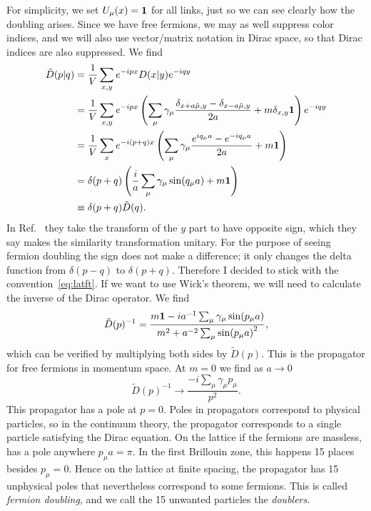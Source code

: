 For simplicity, we set $U_\mu(x)={\mathbf 1}$
for all links, just so we can see clearly how the doubling arises.
Since we have free fermions, we may as well suppress color indices,
and we will also use vector/matrix notation in Dirac space, so that
Dirac indices are also suppressed. We find
\begin{equation}\begin{aligned}
  \tilde{D}(p|q)&=\frac{1}{V}\sum_{x,y}e^{-ipx}D(x|y)e^{-iqy}\\
     &=\frac{1}{V}\sum_{x,y}e^{-ipx}\left(
      \sum_\mu\gamma_\mu\frac{\delta_{x+a\hat{\mu},y}
                             -\delta_{x-a\hat{\mu},y}}{2a}+m\delta_{x,y}{\mathbf 1}
      \right)e^{-iqy}\\
     &=\frac{1}{V}\sum_xe^{-i(p+q)x}\left(
      \sum_\mu\gamma_\mu\frac{e^{iq_\mu a}-e^{-iq_\mu a}}{2a}+m{\mathbf 1}\right)\\
     &=\delta(p+q)\left(\frac{i}{a}\sum_\mu
                    \gamma_\mu\sin(q_\mu a)+m{\mathbf 1}\right)\\
     &\equiv\delta(p+q)\tilde{D}(q).
\end{aligned}\end{equation}
In Ref.~\cite{gattringer_quantum_2010} they take the transform
of the $y$ part to have opposite sign, which they say makes the similarity
transformation unitary. For the purpose of seeing fermion doubling
the sign does not make a difference; it only changes the delta
function from $\delta(p-q)$ to $\delta(p+q)$. Therefore I decided to stick
with the convention~\eqref{eq:latft}. If we want to use Wick's theorem,
we will need to calculate the inverse of the Dirac operator. We find
\begin{equation}\label{eq:latprop}
  \tilde{D}(p)^{-1}=\frac{m{\mathbf 1}-ia^{-1}\sum_\mu\gamma_\mu\sin(p_\mu a)}
                         {m^2+a^{-2}\sum_\mu\sin(p_\mu a)^2},
\end{equation}
which can be verified by multiplying both sides by $\tilde{D}(p)$. This
is the propagator for free fermions in momentum space. At $m=0$ we find
as $a\to0$
\begin{equation}
  \tilde{D}(p)^{-1}\to\frac{-i\sum_\mu\gamma_\mu p_\mu}{p^2}.
\end{equation}
This propagator has a pole at $p=0$. Poles in propagators correspond
to physical particles, so in the continuum theory, the propagator
corresponds to a single particle satisfying the Dirac equation. On
the lattice if the fermions are massless,  has
a pole anywhere $p_\mu a=\pi$. In the first Brillouin zone, this
happens 15 places besides $p_\mu=0$. Hence on the lattice at finite
spacing, the propagator has 15 unphysical poles that nevertheless
correspond to some fermions. This is called {\it fermion doubling},
and we call the 15 unwanted particles the {\it doublers}.

